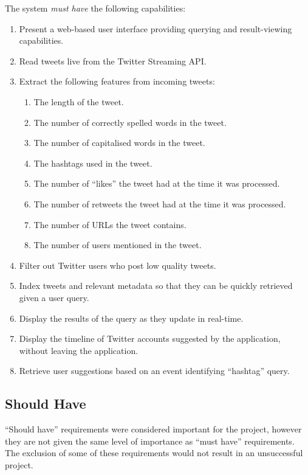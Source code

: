 \documentclass{l4proj}
\begin{document}
    The system \textit{must have} the following capabilities:
    \begin{enumerate}
    \item Present a web-based user interface providing querying and result-viewing capabilities.
    \item Read tweets live from the Twitter Streaming API.
    \item Extract the following features from incoming tweets:
        \begin{enumerate}
        \item The length of the tweet.
        \item The number of correctly spelled words in the tweet.
        \item The number of capitalised words in the tweet.
        \item The hashtags used in the tweet.
        \item The number of ``likes'' the tweet had at the time it was processed. 
        \item The number of retweets the tweet had at the time it was processed.
        \item The number of URLs the tweet contains.
        \item The number of users mentioned in the tweet.
        \end{enumerate} 
    \item Filter out Twitter users who post low quality tweets.
   \item Index tweets and relevant metadata so that they can be quickly retrieved given a user query.
   
   \item Display the results of the query as they update in real-time.
   \item Display the timeline of Twitter accounts suggested by the application, without leaving the application. 
   \item Retrieve user suggestions based on an event identifying ``hashtag'' query.
    \end{enumerate}
    
        \subsection{Should Have}
        
        ``Should have'' requirements were considered important for the project, however they are not given the same level of importance as ``must have'' requirements. The exclusion of some of these requirements would not result in an unsuccessful project.
        
\end{document}
